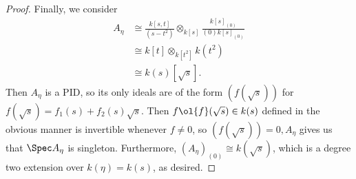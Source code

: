 \documentclass[12pt]{amsart}
\begin{document}
\begin{proof}
  Finally, we consider 
  \begin{align*}
    A_\eta &\cong \frac{k[s,t]}{(s-t^2)}\otimes_{k[s]}\frac{k[s]_{(0)}}{(0)k[s]_{(0)}} \\
           &\cong k[t]\otimes_{k[t^2]}k(t^2) \\
           &\cong k(s)[\sqrt{s}].
  \end{align*}
  Then $A_\eta$ is a PID, so its only ideals are of the form $(f(\sqrt{s}))$ for $f(\sqrt{s})= f_1(s)+f_2(s)\sqrt{s}$.
  Then $f\ol{f}(\sqrt{s})\in k(s)$ defined in the obvious manner is invertible whenever $f\neq 0$, so $(f(\sqrt{s}))=0,A_\eta$ gives us that $\Spec A_\eta$ is singleton.
  Furthermore, $(A_\eta)_{(0)}\cong k(\sqrt{s})$, which is a degree two extension over $k(\eta)=k(s)$, as desired.
\end{proof}

 
\end{document}
